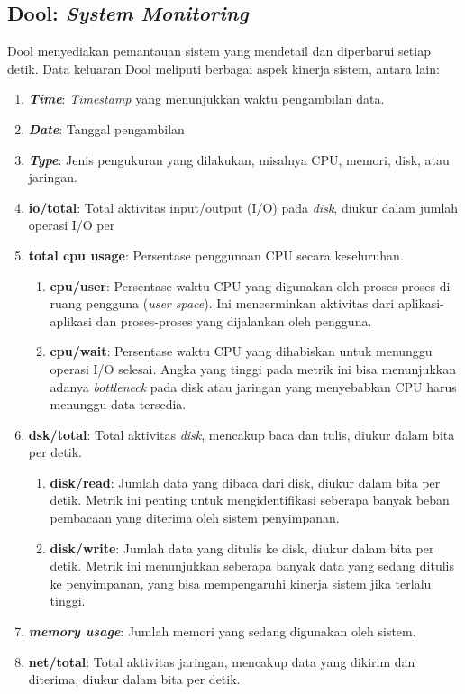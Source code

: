 \subsection{Dool: \textit{System Monitoring}}
Dool menyediakan pemantauan sistem yang mendetail dan diperbarui setiap detik. Data keluaran Dool meliputi berbagai aspek kinerja sistem, antara lain:
\begin{enumerate}
	\item \textbf{\textit{Time}}: \textit{Timestamp} yang menunjukkan waktu pengambilan data.
	\item \textbf{\textit{Date}}: Tanggal pengambilan 
	\item \textbf{\textit{Type}}: Jenis pengukuran yang dilakukan, misalnya CPU, memori, disk, atau jaringan. 
	\item \textbf{io/total}: Total aktivitas input/output (I/O) pada \textit{disk}, diukur dalam jumlah operasi I/O per 
	\item \textbf{total cpu usage}: Persentase penggunaan CPU secara keseluruhan. 
		\begin{enumerate}
		\item \textbf{cpu/user}: Persentase waktu CPU yang digunakan oleh proses-proses di ruang pengguna (\textit{user space}). Ini mencerminkan aktivitas dari aplikasi-aplikasi dan proses-proses yang dijalankan oleh pengguna.
		\item \textbf{cpu/wait}: Persentase waktu CPU yang dihabiskan untuk menunggu operasi I/O selesai. Angka yang tinggi pada metrik ini bisa menunjukkan adanya \textit{bottleneck} pada disk atau jaringan yang menyebabkan CPU harus menunggu data tersedia.
		\end{enumerate}
	\item \textbf{dsk/total}: Total aktivitas \textit{disk}, mencakup baca dan tulis, diukur dalam bita per detik.
		\begin{enumerate}
		\item \textbf{disk/read}: Jumlah data yang dibaca dari disk, diukur dalam bita per detik. Metrik ini penting untuk mengidentifikasi seberapa banyak beban pembacaan yang diterima oleh sistem penyimpanan.
		\item \textbf{disk/write}: Jumlah data yang ditulis ke disk, diukur dalam bita per detik. Metrik ini menunjukkan seberapa banyak data yang sedang ditulis ke penyimpanan, yang bisa mempengaruhi kinerja sistem jika terlalu tinggi.
		\end{enumerate}
	\item \textbf{\textit{memory usage}}: Jumlah memori yang sedang digunakan oleh sistem.
	\item \textbf{net/total}: Total aktivitas jaringan, mencakup data yang dikirim dan diterima, diukur dalam bita per detik.
\end{enumerate}

